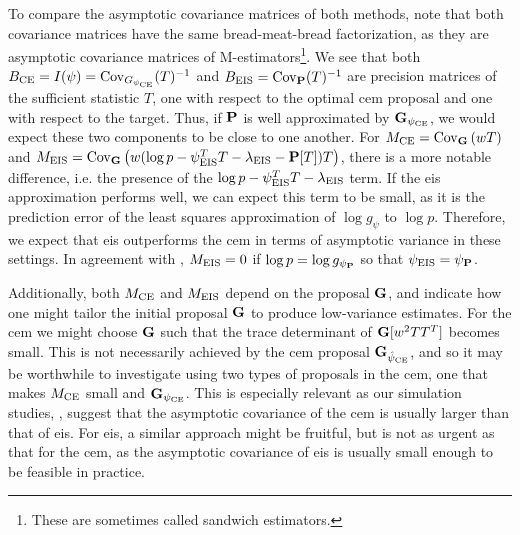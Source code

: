 To compare the asymptotic covariance matrices of both methods, note that both covariance matrices have the same \glqq{}bread-meat-bread\grqq{} factorization, as they are asymptotic covariance matrices of M-estimators\footnote{These are sometimes called sandwich estimators.}. We see that both $B_{\ce} = I(\psi) = \cov_{G_{\pce}}(T)^{-1}$ and $B_{\eis} = \cov_{\P}(T)^{-1}$ are precision matrices of the sufficient statistic $T$, one with respect to the optimal \acrshort{cem} proposal and one with respect to the target. Thus, if $\P$ is well approximated by $\G_{\pce}$, we would expect these two components to be close to one another. 
For $M_{\ce} = \cov_{\G} \left( w T \right)$ and $M_{\eis} = \cov_{\G}\left( w (\log p - \psi_{\eis}^{T}T - \lambda_{\eis} - \P [T])T \right)$, there is a more notable difference, i.e. the presence of the $\log p - \psi_{\eis}^TT-\lambda_{\eis}$ term. If the \acrshort{eis} approximation performs well, we can expect this term to be small, as it is the prediction error of the least squares approximation of $\log g_{\psi}$ to $\log p$. Therefore, we expect that \acrshort{eis} outperforms the \acrshort{cem} in terms of asymptotic variance in these settings. In agreement with , $M_{\eis} = 0$ if $\log p = \log g_{\psi_{\P}}$ so that $\peis = \psi_{\P}$.

Additionally, both $M_{\ce}$ and $M_{\eis}$ depend on the proposal $\G$, and indicate how one might tailor the initial proposal $\G$ to produce low-variance estimates. For the \acrshort{cem} we might choose $\G$ such that the trace determinant of $\G [w^{2} TT^{T}]$ becomes small. This is not necessarily achieved by the \acrshort{cem} proposal $\G_{\hpce}$, and so it may be worthwhile to investigate using two types of proposals in the \acrshort{cem}, one that makes $M_{\ce}$ small and $\G_{\pce}$. This is especially relevant as our simulation studies, , suggest that the asymptotic covariance of the \acrshort{cem} is usually larger than that of \acrshort{eis}. For \acrshort{eis}, a similar approach might be fruitful, but is not as urgent as that for the \acrshort{cem}, as the asymptotic covariance of \acrshort{eis} is usually small enough to be feasible in practice.

